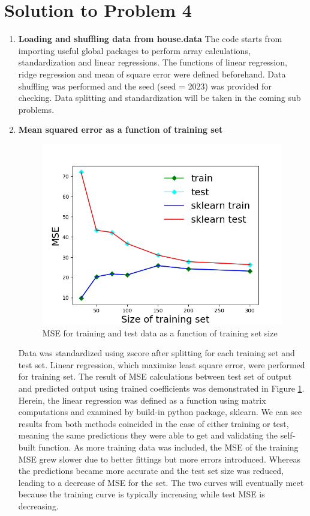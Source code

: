 \documentclass[11pt]{article}
\newcommand{\mfile}[1]  {{\small }} %
\begin{document}
\section*{Solution to Problem 4}
\begin{enumerate}
	\item {\bf Loading and shuffling data from house.data}
	The code starts from importing useful global packages to perform array calculations, standardization and linear regressions. The functions of linear regression, ridge regression and mean of square error were defined beforehand. Data shuffling was performed and the seed (seed = 2023) was provided for checking. Data splitting and standardization will be taken in the coming sub problems.
	\mfile{prob4-1.txt}
	\item {\bf Mean squared error as a function of training set}
	\begin{figure}
		\centering\includegraphics[width=.75\linewidth]{4_2_fig.png}
		\caption{MSE for training and test data as a function of training set size} %
		\label{fig:p4-2}  %
	\end{figure}
	Data was standardized using zscore after splitting for each training set and test set. Linear regression, which maximize least square error, were performed for training set. The result of MSE calculations between test set of output and predicted output using trained coefficients was demonstrated in Figure \ref{fig:p4-2}. Herein, the linear regression was defined as a function using matrix computations and examined by build-in python package, sklearn. We can see results from both methods coincided in the case of either training or test, meaning the same predictions they were able to get and validating the self-built function. As more training data was included, the MSE of the training MSE grew slower due to better fittings but more errors introduced. Whereas the predictions became more accurate and the test set size was reduced, leading to a decrease of MSE for the set. The two curves will eventually meet because the training curve is typically increasing while test MSE is decreasing.

\end{enumerate}
\end{document}
